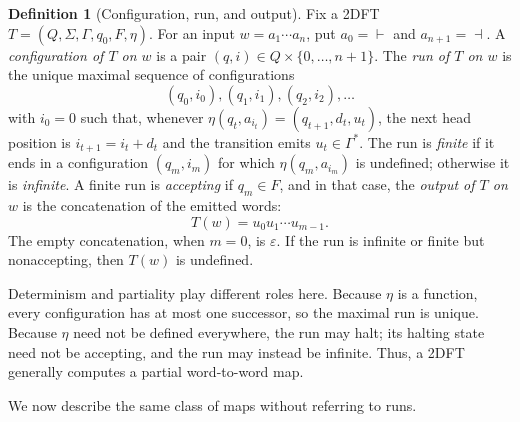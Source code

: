 \documentclass[11pt]{article}
\theoremstyle{definition}
\newtheorem{definition}[theorem]{Definition}
\begin{document}
\begin{definition}[Configuration, run, and output]
\label{def:2dft-run}
Fix a 2DFT $T=(Q,\Sigma,\Gamma,q_0,F,\eta)$.  For an input
$w=a_1\cdots a_n$, put $a_0=\vdash$ and $a_{n+1}=\dashv$.  A
\emph{configuration of $T$ on $w$} is a pair
$(q,i)\in Q\times\{0,\ldots,n+1\}$.  The \emph{run of $T$ on $w$} is the unique
maximal sequence of configurations
\[
   (q_0,i_0),(q_1,i_1),(q_2,i_2),\ldots
\]
with $i_0=0$ such that, whenever $\eta(q_t,a_{i_t})=(q_{t+1},d_t,u_t)$,
the next head position is $i_{t+1}=i_t+d_t$ and the transition emits
$u_t\in\Gamma^*$.  The run is \emph{finite} if it ends in a configuration
$(q_m,i_m)$ for which $\eta(q_m,a_{i_m})$ is undefined; otherwise it is
\emph{infinite}.  A finite run is \emph{accepting} if $q_m\in F$, and in that case,
the \emph{output of $T$ on $w$} is the concatenation of the emitted words:
\[
   T(w)=u_0u_1\cdots u_{m-1}.
\]
The empty concatenation, when $m=0$, is $\varepsilon$.
If the run is infinite or finite but nonaccepting, then $T(w)$ is undefined.
\end{definition}

Determinism and partiality play different roles here.  Because $\eta$ is a
function, every configuration has at most one successor, so the maximal run is
unique.  Because $\eta$ need not be defined everywhere, the run may halt; its
halting state need not be accepting, and the run may instead be infinite.
Thus, a 2DFT generally computes a partial word-to-word map.

We now describe the same class of maps without referring to runs.
\end{document}
